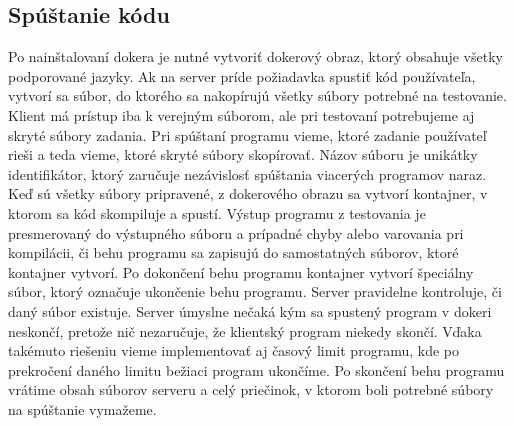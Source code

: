 \subsection{Spúštanie kódu}
Po nainštalovaní dokera je nutné vytvoriť dokerový obraz, ktorý obsahuje všetky podporované
jazyky. Ak na server príde požiadavka spustiť kód používateľa, vytvorí sa súbor, do ktorého sa
nakopírujú všetky súbory potrebné na testovanie. Klient má prístup iba k verejným súborom, ale
pri testovaní potrebujeme aj skryté súbory zadania. Pri spúštaní programu vieme, ktoré zadanie
používateľ rieši a teda vieme, ktoré skryté súbory skopírovať. Názov súboru je unikátky
identifikátor, ktorý zaručuje nezávislosť spúštania viacerých programov naraz. Keď sú všetky súbory
pripravené, z dokerového obrazu sa vytvorí kontajner, v ktorom sa kód skompiluje a spustí. Výstup
programu z testovania je presmerovaný do výstupného súboru a prípadné chyby alebo varovania pri
kompilácii, či behu programu sa zapisujú do samostatných súborov, ktoré kontajner vytvorí. Po
dokončení behu programu kontajner vytvorí špeciálny súbor, ktorý označuje ukončenie behu programu.
Server pravidelne kontroluje, či daný súbor existuje. Server úmyslne nečaká kým sa spustený program
v dokeri neskončí, pretože nič nezaručuje, že klientský program niekedy skončí. Vďaka takémuto
riešeniu vieme implementovať aj časový limit programu, kde po prekročení daného limitu bežiaci
program ukončíme. Po skončení behu programu vrátime obsah súborov serveru a celý priečinok, v
ktorom boli potrebné súbory na spúštanie vymažeme.
